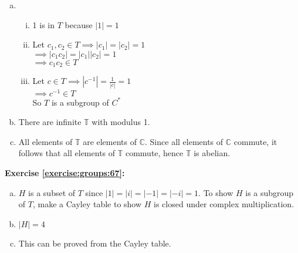 \begin{enumerate}[(a)]
\item
	\begin{enumerate}[(i)]
	\item
	1 is in $T$ because $|1|=1$
	
	\item
	Let $c_1,c_2\in T\implies |c_1|=|c_2|=1$\\
	$\implies |c_1c_2|=|c_1||c_2|=1$\\
	$\implies c_1c_2\in T$
	
	\item
	Let $c\in T \implies |c^{-1}|=\displaystyle\frac{1}{|c|}=1$\\
	$\implies c^{-1}\in T$\\
	So $T$ is a subgroup of $C^*$
	\end{enumerate}
	
\item
There are infinite $\mathbb{ T}$ with modulus 1.

\item
All elements of ${\mathbb T}$  are elements of ${\mathbb C}$.  Since all elements of ${\mathbb C}$ commute, it follows that all elements of ${\mathbb T}$ commute, hence ${\mathbb T}$ is abelian.\\
\end{enumerate}

\noindent\textbf{Exercise \ref{exercise:groups:67}:}
\begin{enumerate}[(a)]
\item
$H$ is a subset of $T$ since $|1|=|i|=|-1|=|-i|=1$. To show $H$ is a subgroup of $T$, make
a Cayley table to show $H$ is closed under complex multiplication. 

\item  
$|H|=4$

\item
This can be proved from the Cayley table.
\end{enumerate}

